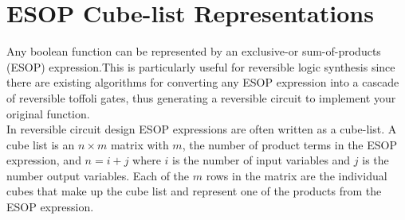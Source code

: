 \section{ESOP Cube-list Representations}

Any boolean function can be represented by an exclusive-or sum-of-products (ESOP) expression.This is
particularly useful for reversible logic synthesis since there are existing algorithms for converting 
any ESOP expression into a cascade of reversible toffoli gates, thus generating a reversible circuit 
to implement your original function. \\ 


In reversible circuit design ESOP expressions are often written as a cube-list. A cube list is an $ n \times m $
matrix with $m$, the number of product terms in the ESOP expression, and $n = i + j$ where $i$ is the number 
of input variables and $j$ is the number output variables. Each of the $m$ rows in the matrix are the individual
cubes that make up the cube list and represent one of the products from the ESOP expression. \\

